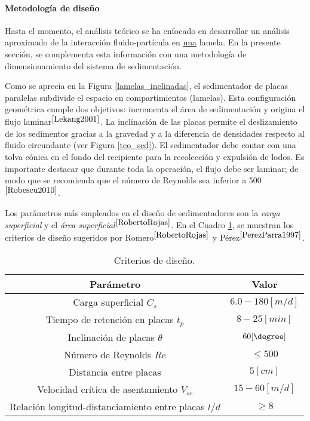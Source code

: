 \paragraph{Metodolog\'ia de dise\~no}

\noindent
\justify

Hasta el momento, el an\'alisis te\'orico se ha enfocado en desarrollar un an\'alisis aproximado de la interacci\'on fluido-part\'icula en \underline{una} lamela. En la presente secci\'on, se complementa esta informaci\'on con una metodolog\'ia de dimensionamiento del sistema de sedimentaci\'on.

\noindent
\justify

Como se aprecia en la Figura \ref{lamelas_inclinadas}, el sedimentador de placas paralelas subdivide el espacio en compartimientos (lamelas). Esta configuraci\'on geom\'etrica cumple dos objetivos: incrementa el \'area de sedimentaci\'on y origina el flujo laminar$^{\cite{Lekang2001}}$. La inclinaci\'on de las placas permite el deslizamiento de los sedimentos gracias a la gravedad y a la diferencia de densidades respecto al fluido circundante (ver Figura \ref{teo_sed}). El sedimentador debe contar con una tolva c\'onica en el fondo del recipiente para la recolecci\'on y expulsi\'on de lodos. Es importante destacar que durante toda la operaci\'on, el flujo debe ser laminar; de modo que se recomienda que el n\'umero de Reynolds sea inferior a 500$^{\cite{Robescu2010}}$. 

\noindent
\justify

Los par\'ametros m\'as empleados en el dise\~no de sedimentadores son la \textit{carga superficial} y el \textit{\'area superficial}$^{\cite{RobertoRojas}}$. En el Cuadro \ref{critSed}, se muestran los criterios de dise\~no sugeridos por Romero$^{\cite{RobertoRojas}}$ y P\'erez$^{\cite{PerezParra1997}}$.

\begin{table}[h!]
	\centering
	\begin{tabular}{|c|c|}
		\hline
		\textbf{Par\'ametro} & \textbf{Valor} \\ \hline
		Carga superficial $C_s$ & $6.0 - 180 [m/d]$ \\ \hline
		Tiempo de retenci\'on en placas $t_p$ & $8 - 25 [min]$ \\ \hline
		Inclinaci\'on de placas $\theta$ & $60 [\degree]$ \\ \hline
		N\'umero de Reynolds $Re$ & $\le 500$ \\ \hline
		Distancia entre placas & $5 [cm]$ \\ \hline
		Velocidad cr\'itica de asentamiento $V_{sc}$ & $15 - 60 [m/d]$ \\ \hline
		Relaci\'on longitud-distanciamiento entre placas $l/d$ & $\ge 8$ \\ \hline
	\end{tabular}
	\caption{Criterios de dise\~no.}
	\label{critSed}
\end{table}

